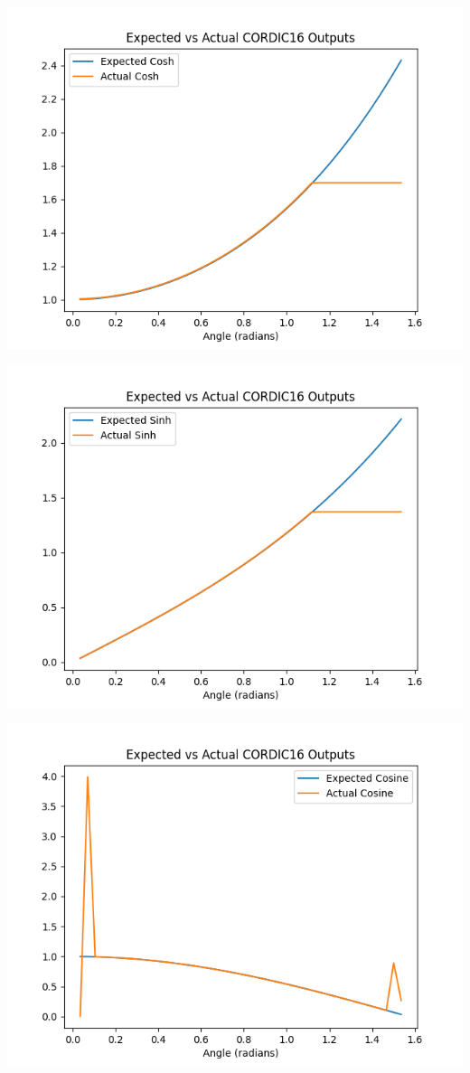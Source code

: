 \documentclass{article}
\begin{document}
\begin{center}
        \includegraphics[scale=.7]{cordic16_cosh.png}

        \includegraphics[scale=.7]{cordic16_sinh.png}

        \includegraphics[scale=.7]{cordic16_cos.png}


\end{center}
\end{document}
